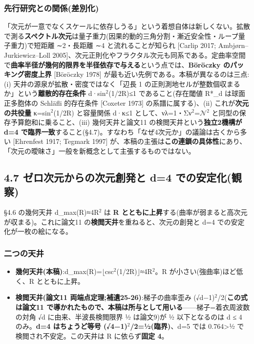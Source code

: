 \documentclass[
]{ltjsarticle}
\providecommand{\tightlist}{%
  \setlength{\itemsep}{0pt}\setlength{\parskip}{0pt}}
\begin{document}
\subsubsection{先行研究との関係(差別化)}\label{ux5148ux884cux7814ux7a76ux3068ux306eux95a2ux4fc2ux5deeux5225ux5316}

「次元が一意でなくスケールに依存しうる」という着想自体は新しくない。拡散で測る\textbf{スペクトル次元}は量子重力(因果的動的三角分割・漸近安全性・ループ量子重力)で短距離
∼2・長距離 ∼4 と流れることが知られ {[}Carlip 2017;
Ambjørn--Jurkiewicz--Loll
2005{]}、次元正則化やフラクタル次元も同系である。定曲率空間で\textbf{曲率半径が幾何的限界を半径依存で与える}という点では、\textbf{Böröczky
のパッキング密度上界} {[}Böröczky 1978{]}
が最も近い先例である。本稿が異なるのは三点:(i)
天井の源泉が拡散・密度ではなく「辺長 1
の正則測地セルが整数個収まるか」という\textbf{離散的存在条件}
d·sin\(^{2}\)(1/2R)≤1 であること(存在閾値 R*\_d は球面正多胞体の
Schläfli 的存在条件 {[}Coxeter 1973{]} の系譜に属する)、(ii)
これが\textbf{次元の共役量} κ=sin\(^{2}\)(1/2R) と容量関係 d·κ≤1
として、νλ=1・Σν\(^{2}\)=\(\mathcal{N}\)\(^{2}\)
と同型の保存予算飽和に乗ること、(iii) 幾何天井と論文11
の検閲天井という\textbf{独立2機構が d=4
で臨界一致}すること(§4.7)。すなわち「なぜ4次元か」の議論は古くから多い
{[}Ehrenfest 1917; Tegmark 1997{]}
が、本稿の主張は\textbf{この連鎖の具体性}にあり、「次元の曖昧さ」一般を新概念として主張するものではない。

\subsection{4.7 ゼロ次元からの次元創発と d=4
での安定化(観察)}\label{ux30bcux30edux6b21ux5143ux304bux3089ux306eux6b21ux5143ux5275ux767aux3068-d4-ux3067ux306eux5b89ux5b9aux5316ux89b3ux5bdf}

§4.6 の幾何天井 d\_max(R)≈4R\(^{2}\) は \textbf{R
とともに上昇}する(曲率が弱まると高次元が収まる)。これに論文11
の\textbf{検閲天井}を重ねると、次元の創発と d=4
での安定化が一枚の絵になる。

\subsubsection{二つの天井}\label{ux4e8cux3064ux306eux5929ux4e95}

\begin{itemize}
\tightlist
\item
  \textbf{幾何天井(本稿)}:d\_max(R)=\(\lfloor\)csc\(^{2}\)(1/2R)\(\rfloor\)≈4R\(^{2}\)。R
  が小さい(強曲率)ほど低く、R とともに上昇。
\item
  \textbf{検閲天井(論文11 両端点定理;補遺25-26)}:梯子の曲率歪み
  (√d−1)\(^{2}\)/2(\textbf{この式は論文11
  で導かれたもので、本稿は所与として用いる}------梯子=着衣周波数の対角
  √d に由来、半波長検閲限界 ½ は論文9)が ½ 以下となるのは d ≤ 4
  のみ。\textbf{d=4 はちょうど等号 (√4−1)\(^{2}\)/2=½(臨界)}、d=5 では
  0.764\textgreater½ で検閲され不安定。この天井は R に依らず\textbf{固定
  4}。
\end{itemize}
\end{document}
